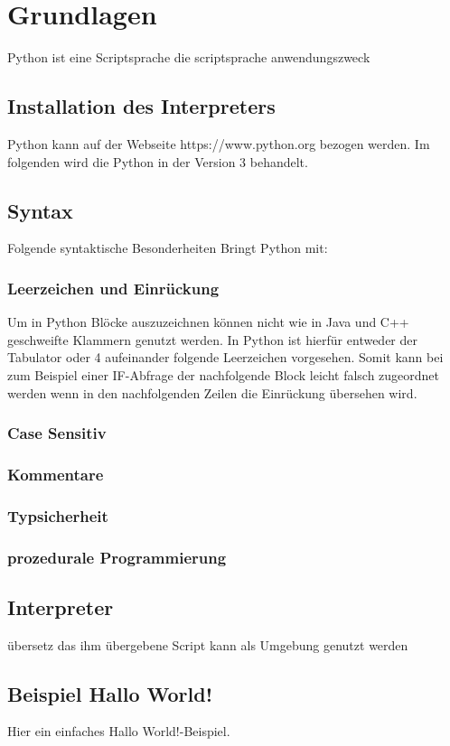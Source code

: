 
\section{Grundlagen}
Python ist eine Scriptsprache die 
scriptsprache
anwendungszweck

\subsection{Installation des Interpreters}
Python kann auf der Webseite https://www.python.org bezogen werden.
Im folgenden wird die Python in der Version 3 behandelt.





\subsection{Syntax}
Folgende syntaktische Besonderheiten Bringt Python mit:
\subsubsection{Leerzeichen und Einrückung}
Um in Python Blöcke auszuzeichnen können nicht wie in Java und C++ geschweifte Klammern genutzt werden. 
In Python ist hierfür entweder der Tabulator oder 4 aufeinander folgende Leerzeichen vorgesehen.
Somit kann bei zum Beispiel einer IF-Abfrage der nachfolgende Block leicht falsch zugeordnet werden wenn in den nachfolgenden Zeilen die Einrückung übersehen wird.
\subsubsection{Case Sensitiv}
\subsubsection{Kommentare}
\subsubsection{Typsicherheit}
\subsubsection{prozedurale Programmierung}
\subsection{Interpreter}
übersetz das ihm übergebene Script
kann als Umgebung genutzt werden


\subsection{Beispiel \glqq Hallo World!\grqq}
Hier ein einfaches \glqq Hallo World!\grqq -Beispiel.


